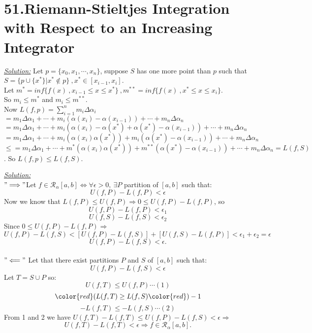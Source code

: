 \documentclass{book}
\begin{document}
\section{51.Riemann-Stieltjes Integration with Respect to an Increasing
Integrator}
\begin{tcolorbox}[enhanced,attach boxed title to top center={yshift=-3mm,yshifttext=-1mm},
colback=blue!5!white,colframe=blue!75!black,colbacktitle=red!80!black,
title=Exercise 51.2:,fonttitle=\bfseries,
boxed title style={size=small,colframe=red!50!black} ]
\textit{\color{blue}\underline{Solution:}}
Let $p=\{x_0,x_1,\cdots,x_n\}$, suppose $S$ has one more point than $p$ such that
$S=\{p\cup\{x^*\}|x^*\notin p\}~,x^*\in [x_{i-1},x_i]$.\\
Let $m^*=inf \{f(x)~,x_{i-1}\leq x\leq x^*\}~,m^{**}=inf\{f(x)~,x^*\leq
x\leq x_i\}.$\\
So $m_i\leq m^*$ and $m_i\leq m^{**}$.\\
Now $L(f,p)=\sum_{i=1}^n m_i\Delta\alpha_i$\\
$=m_1\Delta\alpha_1+\cdots+m_i(\alpha(x_i)-\alpha(x_{i-1}))+\cdots+m_n\Delta\alpha_n$\\
$=m_1\Delta\alpha_1+\cdots+m_i(\alpha(x_i)-\alpha(x^*)+\alpha(x^*)-\alpha(x_{i-1}))+\cdots+m_n\Delta\alpha_n$\\
$=m_1\Delta\alpha_1+\cdots+m_i(\alpha(x_i)\alpha(x^*))+m_i(\alpha(x^*)-\alpha(x_{i-1}))+\cdots+m_n\Delta\alpha_n$\\
$\leq=m_1\Delta\alpha_1+\cdots+m^*(\alpha(x_i)\alpha(x^*))+m^{**}(\alpha(x^*)-\alpha(x_{i-1}))+\cdots+m_n\Delta\alpha_n=L(f,S)$. 
So $L(f,p)\leq L(f,S)$.

\end{tcolorbox}
\begin{tcolorbox}[enhanced,attach boxed title to top center={yshift=-3mm,yshifttext=-1mm},
colback=blue!5!white,colframe=blue!75!black,colbacktitle=red!80!black,
title=Exercise 51.3:,fonttitle=\bfseries,
boxed title style={size=small,colframe=red!50!black} ]
\textit{\color{blue}\underline{Solution:}}\\
{\color{red}$"\Longrightarrow"$}Let $f\in\mathscr{R}_\alpha[a,b]\iff\forall\epsilon>0,~\exists P$ 
partition of $[a,b]$ such that:$$U(f,P)-L(f,P)<\epsilon$$
Now we know that $L(f,P)\leq U(f,P)\Rightarrow 0\leq U(f,P)-L(f,P)$, so
$$U(f,P)-L(f,P)<\epsilon_1$$
$$U(f,S)-L(f,S)<\epsilon_2$$
Since $ 0\leq U(f,P)-L(f,P)\Rightarrow$\\
$U(f,P)-L(f,S)<\left[U(f,P)-L(f,S) \right]+\left[U(f,S)-L(f,P)
\right]<\epsilon_1+\epsilon_2=\epsilon$
$$U(f,P)-L(f,S)<\epsilon.$$
\noindent{\color{blue}\rule{\linewidth}{.3mm}}\\
{\color{red}$"\Longleftarrow"$}
Let that there exist partitions $P$ and $S$ of $[a,b]$ such that: $$U(f,P)-L(f,S)<\epsilon$$
Let $T=S\cup P$ so:
$$U(f,T)\leq U(f,P)\cdots (1)$$
$${\color{red} (} L(f,T)\geq L(f,S) {\color{red} )-1}$$
$$-L(f,T)\leq -L(f,S)\cdots (2)$$
From 1 and 2 we have $U(f,T)-L(f,T)\leq U(f,P)-L(f,S)<\epsilon\Rightarrow$
$$U(f,T)-L(f,T)<\epsilon\Rightarrow f\in\mathscr{R}_\alpha[a,b].$$


\end{tcolorbox}
\end{document}
